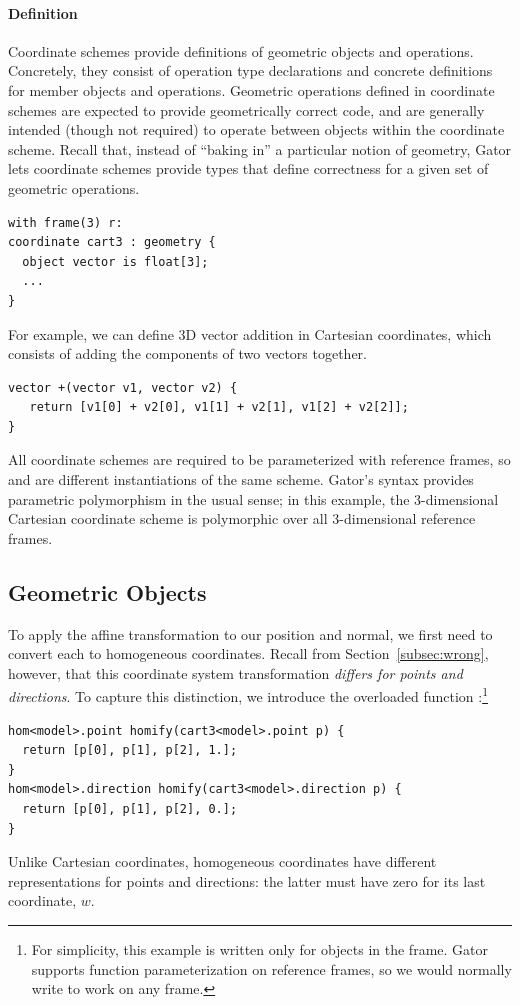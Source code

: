 \paragraph{Definition}
Coordinate schemes provide definitions of geometric objects and operations.
Concretely, they consist of operation type declarations and concrete definitions for member objects and operations.
Geometric operations defined in coordinate schemes are expected to provide geometrically correct code, and are generally intended (though not required) to operate between objects within the coordinate scheme.
Recall that, instead of ``baking in'' a particular notion of geometry, Gator lets coordinate schemes provide types that define correctness for a given set of geometric operations.
%
\begin{lstlisting}
with frame(3) r:
coordinate cart3 : geometry {
  object vector is float[3];
  ...
}
\end{lstlisting}
For example, we can define 3D vector addition in Cartesian coordinates, which consists of adding the components of two vectors together.
\begin{lstlisting}
vector +(vector v1, vector v2) {
   return [v1[0] + v2[0], v1[1] + v2[1], v1[2] + v2[2]];
}
\end{lstlisting}
%
All coordinate schemes are required to be parameterized with reference frames, so  and  are different instantiations of the same scheme.
Gator's  syntax provides parametric polymorphism in the usual sense; in this example, the 3-dimensional Cartesian coordinate scheme is polymorphic over all 3-dimensional reference frames.

\subsection{Geometric Objects}
\label{subsec:objects}

To apply the  affine transformation to our position and normal, we first need to convert each to homogeneous coordinates.  Recall from Section~\ref{subsec:wrong}, however, that this coordinate system transformation \emph{differs for points and directions}.
To capture this distinction, we introduce the overloaded function :\footnote{For simplicity, this example  is written only for objects in the  frame.  Gator supports function parameterization on reference frames, so we would normally write  to work on any frame.}
%
\begin{lstlisting}
hom<model>.point homify(cart3<model>.point p) {
  return [p[0], p[1], p[2], 1.]; 
} 
hom<model>.direction homify(cart3<model>.direction p) {
  return [p[0], p[1], p[2], 0.]; 
}
\end{lstlisting}
%
Unlike Cartesian coordinates, homogeneous coordinates have different representations for points and directions: the latter must have zero for its last coordinate, $w$.

